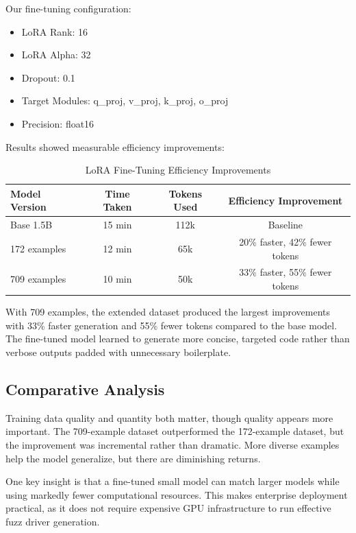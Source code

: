 Our fine-tuning configuration:
\begin{itemize}
    \item LoRA Rank: 16
    \item LoRA Alpha: 32
    \item Dropout: 0.1
    \item Target Modules: q\_proj, v\_proj, k\_proj, o\_proj
    \item Precision: float16
\end{itemize}

Results showed measurable efficiency improvements:

\begin{table}[htbp]
\centering
\caption{LoRA Fine-Tuning Efficiency Improvements}
\label{tab:lora_efficiency}
\small
\begin{tabular}{lccc}
\toprule
Model Version & Time Taken & Tokens Used & Efficiency Improvement \\
\midrule
Base 1.5B & 15 min & 112k & Baseline \\
172 examples & 12 min & 65k & 20\% faster, 42\% fewer tokens \\
709 examples & 10 min & 50k & 33\% faster, 55\% fewer tokens \\
\bottomrule
\end{tabular}
\end{table}

With 709 examples, the extended dataset produced the largest improvements with 33\% faster generation and 55\% fewer tokens compared to the base model. The fine-tuned model learned to generate more concise, targeted code rather than verbose outputs padded with unnecessary boilerplate.


\subsection{Comparative Analysis}
\label{sec:results_lora_analysis}

Training data quality and quantity both matter, though quality appears more important. The 709-example dataset outperformed the 172-example dataset, but the improvement was incremental rather than dramatic. More diverse examples help the model generalize, but there are diminishing returns.

One key insight is that a fine-tuned small model can match larger models while using markedly fewer computational resources. This makes enterprise deployment practical, as it does not require expensive GPU infrastructure to run effective fuzz driver generation.

